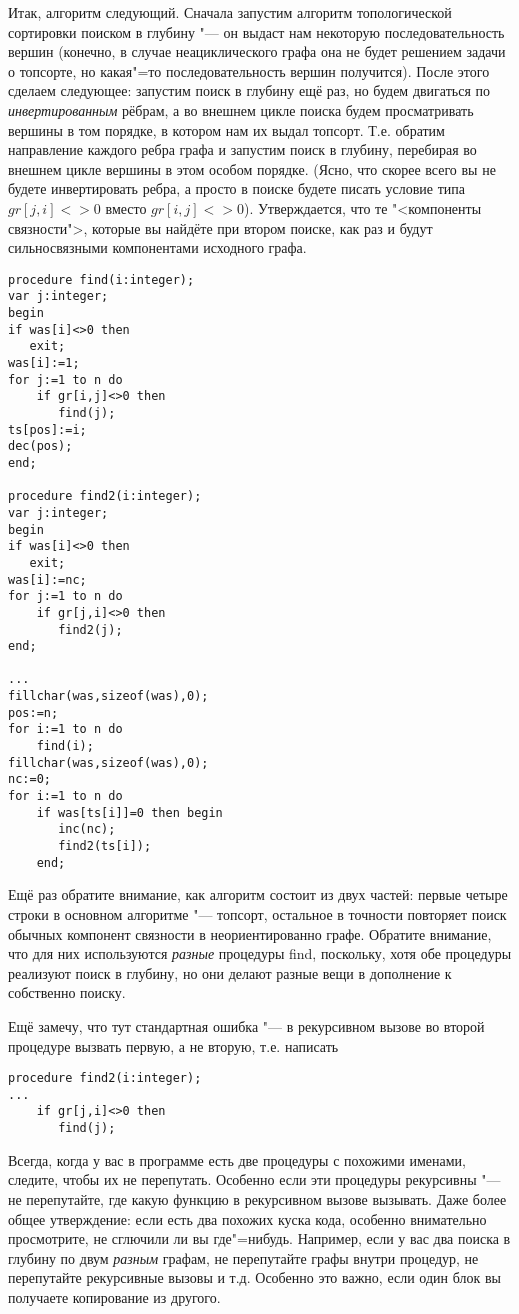 Итак, алгоритм следующий. Сначала запустим алгоритм топологической сортировки поиском в глубину "--- он выдаст 
нам некоторую последовательность вершин (конечно, в случае неациклического графа она не будет решением задачи о топсорте, 
но какая"=то последовательность вершин получится). После этого сделаем следующее: запустим поиск в глубину ещё раз, но будем
двигаться по \textit{инвертированным} рёбрам, а во внешнем цикле поиска будем просматривать вершины в том порядке, 
в котором нам их выдал топсорт. Т.е. обратим направление каждого ребра графа и запустим поиск в глубину, перебирая 
во внешнем цикле вершины в этом особом порядке. (Ясно, что скорее всего вы не будете инвертировать ребра,
а просто в поиске будете писать условие типа $gr[j,i]<>0$ вместо $gr[i,j]<>0$). Утверждается, что те "<компоненты
связности">, которые вы найдёте при втором поиске, как раз и будут сильносвязными компонентами исходного графа.

\begin{codesamplec}{3}\begin{verbatim}
procedure find(i:integer);
var j:integer;
begin
if was[i]<>0 then
   exit;
was[i]:=1;
for j:=1 to n do
    if gr[i,j]<>0 then
       find(j);
ts[pos]:=i;
dec(pos);
end;

procedure find2(i:integer);
var j:integer;
begin
if was[i]<>0 then
   exit;
was[i]:=nc;
for j:=1 to n do
    if gr[j,i]<>0 then
       find2(j);
end;

...
fillchar(was,sizeof(was),0);
pos:=n;
for i:=1 to n do
    find(i);
fillchar(was,sizeof(was),0);
nc:=0;
for i:=1 to n do
    if was[ts[i]]=0 then begin
       inc(nc);
       find2(ts[i]);
    end;
\end{verbatim}
\end{codesamplec}

Ещё раз обратите внимание, как алгоритм состоит из двух частей: первые четыре строки в основном алгоритме "--- топсорт,
остальное в точности повторяет поиск обычных компонент связности в неориентированно графе. Обратите внимание, что для
них используются \textit{разные} процедуры find, поскольку, хотя обе процедуры реализуют поиск в глубину,
но они делают разные вещи в дополнение к собственно поиску. 

Ещё замечу, что тут стандартная ошибка "--- в рекурсивном вызове во второй процедуре вызвать первую, а не вторую,
 т.е. написать
\begin{codesampleo}\begin{verbatim}
procedure find2(i:integer);
...
    if gr[j,i]<>0 then
       find(j);
\end{verbatim}
\end{codesampleo}
Всегда, когда у вас в программе есть две процедуры с похожими именами, следите, чтобы их не перепутать. Особенно если эти процедуры рекурсивны "--- не перепутайте, где какую функцию в рекурсивном вызове вызывать. Даже более общее утверждение: 
если есть два похожих куска кода, особенно внимательно просмотрите, не сглючили ли вы где"=нибудь. Например, если
у вас два поиска в глубину по двум \textit{разным} графам, не перепутайте графы внутри процедур, не перепутайте рекурсивные
вызовы и т.д. Особенно это важно, если один блок вы получаете копирование из другого.

